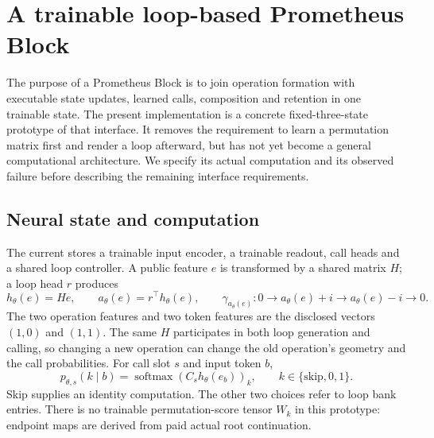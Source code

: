 \section{A trainable loop-based Prometheus Block}
\label{sec:prometheus-block}

The purpose of a Prometheus Block is to join operation formation with
executable state updates, learned calls, composition and retention in one
trainable state. The present implementation is a concrete fixed-three-state
prototype of that interface. It removes the requirement to learn a
permutation matrix first and render a loop afterward, but has not yet become
a general computational architecture. We specify its actual computation and
its observed failure before describing the remaining interface requirements.

\subsection{Neural state and computation}

The current  stores a trainable input encoder, a
trainable readout, call heads and a shared loop controller. A public feature
$e$ is transformed by a shared matrix $H$; a loop head $r$ produces
\begin{equation}
 h_\theta(e)=He,\qquad a_\theta(e)=r^\top h_\theta(e),
 \qquad
 \gamma_{a_\theta(e)}:0\to a_\theta(e)+i\to a_\theta(e)-i\to0.
 \label{eq:block-loop-controller}
\end{equation}
The two operation features and two token features are the disclosed vectors
$(1,0)$ and $(1,1)$. The same $H$ participates in both loop generation and
calling, so changing a new operation can change the old operation's geometry
and the call probabilities. For call slot $s$ and input token $b$,
\begin{equation}
 p_{\theta,s}(k\mid b)=\operatorname{softmax}(C_s h_\theta(e_b))_k,
 \qquad k\in\{\mathrm{skip},0,1\}.
 \label{eq:block-call-head}
\end{equation}
Skip supplies an identity computation. The other two choices refer to loop
bank entries. There is no trainable permutation-score tensor $W_k$ in this
prototype: endpoint maps are derived from paid actual root continuation.

